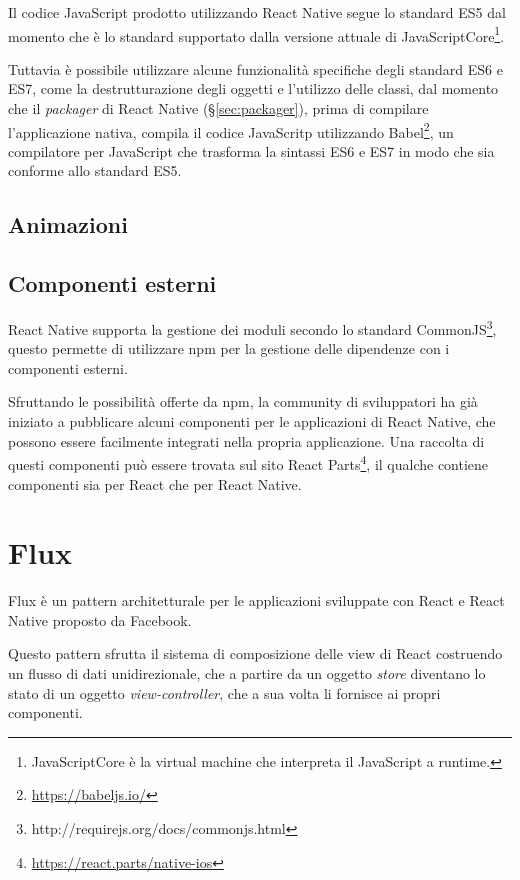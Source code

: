 Il codice JavaScript prodotto utilizzando React Native segue lo standard ES5 dal momento che è lo standard supportato dalla versione attuale di JavaScriptCore\footnote{JavaScriptCore è la virtual machine che interpreta il JavaScript a runtime.}.

Tuttavia è possibile utilizzare alcune funzionalità specifiche degli standard ES6 e ES7, come la destrutturazione degli oggetti e l'utilizzo delle classi, dal momento che il \textit{packager} di React Native (§\ref{sec:packager}), prima di compilare l'applicazione nativa, compila il codice JavaScritp utilizzando Babel\footnote{\url{https://babeljs.io/}}, un compilatore per JavaScript che trasforma la sintassi ES6 e ES7 in modo che sia conforme allo standard ES5.

\subsection{Animazioni}


\subsection{Componenti esterni}

React Native supporta la gestione dei moduli secondo lo standard CommonJS\footnote{http://requirejs.org/docs/commonjs.html}, questo permette di utilizzare npm per la gestione delle dipendenze con i componenti esterni.

Sfruttando le possibilità offerte da npm, la community di sviluppatori ha già iniziato a pubblicare alcuni componenti per le applicazioni di React Native, che possono essere facilmente integrati nella propria applicazione.
Una raccolta di questi componenti può essere trovata sul sito React Parts\footnote{\url{https://react.parts/native-ios}}, il qualche contiene componenti sia per React che per React Native.

\section{Flux}\label{sec:flux}
Flux è un pattern architetturale per le applicazioni sviluppate con React e React Native proposto da Facebook.

Questo pattern sfrutta il sistema di composizione delle view di React costruendo un flusso di dati unidirezionale, che a partire da un oggetto \textit{store} diventano lo stato di un oggetto \textit{view-controller}, che a sua volta li fornisce ai propri componenti.

